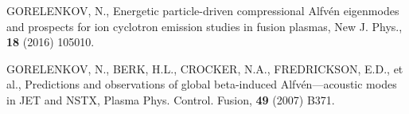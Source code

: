 \documentclass[10pt, a4paper, twoside]{article}
\begin{document}
\begin{thebibliography}{9}
    GORELENKOV, N.,
    Energetic particle-driven compressional Alfv\'en eigenmodes and prospects for ion cyclotron emission studies in fusion plasmas,
    New J. Phys.,
    \textbf{18}
    (2016) 
    105010.

    GORELENKOV, N., BERK, H.L., CROCKER, N.A., FREDRICKSON, E.D., et al., 
    Predictions and observations of global beta-induced Alfv\'en—acoustic modes in JET and NSTX,
    Plasma Phys. Control. Fusion,
    \textbf{49}
    (2007) 
    B371.

\end{thebibliography}
\end{document}
